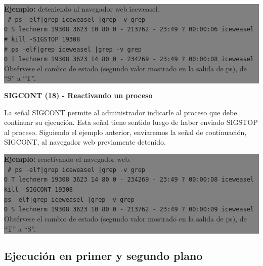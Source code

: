 \documentclass[12pt]{article}
\begin{document}
\colorbox{grey}{\parbox[t]{0.95\linewidth}{ \vspace*{0.5cm} { 
{\bf Ejemplo:} deteniendo al navegador web iceweasel. \\
{\tt
\# ps -elf|grep iceweasel |grep -v grep \\
0 S lechnerm 19308  3623 10  80   0 - 213762 -     23:49 ?    00:00:06 iceweasel \\

\# kill -SIGSTOP 19308 \\

\# ps -elf|grep iceweasel |grep -v grep \\
0 T lechnerm 19308  3623 14  80   0 - 234269 -     23:49 ?    00:00:08 iceweasel \\
}
Obsérvese el cambio de estado (segundo valor mostrado en la salida de ps), 
de ``S'' a ``T''. 
} \vspace*{0.5cm} } } 


\textbf{SIGCONT (18) - Reactivando un proceso}

La señal SIGCONT permite al administrador indicarle al proceso que debe 
continuar su ejecución. Esta señal tiene sentido luego de haber enviado 
SIGSTOP al proceso. Siguiendo el ejemplo anterior, enviaremos la señal de
continuación, SIGCONT, al navegador web previamente detenido.  


\colorbox{grey}{\parbox[t]{0.95\linewidth}{ \vspace*{0.5cm} { 
{\bf Ejemplo:} reactivando el navegador web. \\
{\tt
\# ps -elf|grep iceweasel |grep -v grep  \\
0 T lechnerm 19308  3623 14  80   0 - 234269 -     23:49 ?    00:00:08 iceweasel \\

kill -SIGCONT 19308 \\

ps -elf|grep iceweasel |grep -v grep  \\
0 S lechnerm 19308  3623 10  80   0 - 213762 -     23:49 ?    00:00:09 iceweasel \\
}
Obsérvese el cambio de estado (segundo valor mostrado en la salida de ps), 
de ``T'' a ``S''. 

} \vspace*{0.5cm} } }

\subsection*{Ejecución en primer y segundo plano}
\end{document}
